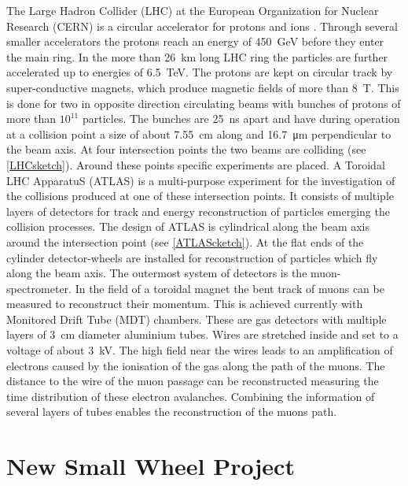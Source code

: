 \documentclass[
twoside,            %
BCOR1.4cm,          %
10pt,               %
headings=normal,    %
headsepline,        %
clearplainpage,		%
final,              %
div=14,
open=right,
bibliography=toc
]{scrreprt}
\begin{document}
The Large Hadron Collider (LHC) at the European Organization for Nuclear Research (CERN) is a circular accelerator for protons and ions \cite{LHCtdr}.
Through several smaller accelerators the protons reach an energy of \SI{450}{GeV} before they enter the main ring.
In the more than \SI{26}{km} long LHC ring the particles are further accelerated up to energies of \SI{6.5}{TeV}.
The protons are kept on circular track by super-conductive magnets, which produce magnetic fields of more than \SI{8}{T}.
This is done for two in opposite direction circulating beams with bunches of protons of more than $10^{11}$ particles.
The bunches are \SI{25}{ns} apart and have during operation at a collision point a size of about \SI{7.55}{cm} along and \SI{16.7}{\micro m} perpendicular to the beam axis.
At four intersection points the two beams are colliding (see \ref{LHCsketch}).
Around these points specific experiments are placed.
A Toroidal LHC ApparatuS (ATLAS) is a multi-purpose experiment for the investigation of the collisions produced at one of these intersection points.
It consists of multiple layers of detectors for track and energy reconstruction of particles emerging the collision processes.
The design of ATLAS is cylindrical along the beam axis around the intersection point (see \ref{ATLAScketch}).
At the flat ends of the cylinder detector-wheels are installed for reconstruction of particles which fly along the beam axis. 
The outermost system of detectors is the muon-spectrometer.
In the field of a toroidal magnet the bent track of muons can be measured to reconstruct their momentum.
This is achieved currently with Monitored Drift Tube (MDT) chambers.
These are gas detectors with multiple layers of \SI{3}{cm} diameter aluminium tubes.
Wires are stretched inside and set to a voltage of about \SI{3}{kV}.
The high field near the wires leads to an amplification of electrons caused by the ionisation of the gas along the path of the muons.
The distance to the wire of the muon passage can be reconstructed measuring the time distribution of these electron avalanches.
Combining the information of several layers of tubes enables the reconstruction of the muons path.

\section{New Small Wheel Project}
\end{document}
